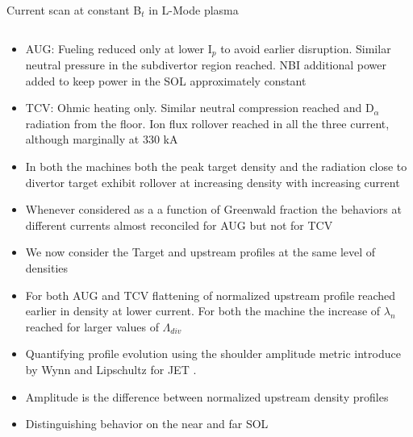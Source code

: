 \documentclass[10pt, compress]{beamer}
\begin{document}
\begin{frame}{Current scan at constant B$_t$ in L-Mode plasma}
\begin{columns}
\begin{column}{0.4\textwidth}
\begin{itemize}
        \item<2|only@2> AUG: Fueling reduced only at lower I$_p$ to
          avoid earlier disruption. Similar neutral pressure in the
          subdivertor region reached. NBI additional power added to
          keep power in the SOL approximately constant
        \item<3|only@3> TCV: Ohmic heating only. Similar neutral compression reached and
          D$_{\alpha}$ radiation from the floor. Ion flux rollover
          reached in all the three current,  although marginally at
          330 kA
        \item<4|only@4> In both the machines both the peak target
          density and the radiation close to divertor target exhibit
          rollover at increasing density with increasing current
        \item<5|only@5> Whenever considered as a a function of
          Greenwald fraction the behaviors at different currents
          almost reconciled for AUG \alert{but not for TCV}
        \item<only@6-7> We now consider the Target and upstream
          profiles at the same level of densities  
        \item<only@7> For both AUG and TCV flattening of normalized
          upstream profile reached \alert{earlier in density at lower
            current.} For both the machine the increase of $\lambda_n$
          reached for larger values of $\Lambda_{div}$
        \item<only@8> Quantifying profile evolution using the
          \alert{shoulder amplitude metric} introduce by Wynn and
          Lipschultz for JET \parencite{Wynn:2018gp}.
        \item<only@8>  \alert{Amplitude is the difference
            between normalized upstream density profiles}
        \item<only@8> Distinguishing behavior on the near and far SOL  

\end{itemize}
\end{column}
\end{columns}
\end{frame}
\end{document}
